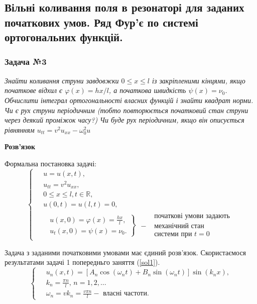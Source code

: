 \subsection{Вільні коливання поля в резонаторі для заданих початкових умов. Ряд Фур'є по системі ортогональних функцій.}

\subsubsection{Задача №3}

\textit{Знайти коливання струни завдовжки $0 \leq x \leq l$ із закріпленими кінцями, якщо початкове відхил є $\varphi(x) = hx/l$, а початкова швидкість $\psi(x) = \nu_0$. Обчислити інтеграл ортогональності власних функцій і знайти квадрат норми. Чи є рух струни періодичним (тобто повторюється початковий стан струни через деякий проміжок часу?) Чи буде рух періодичним, якщо він описується рівнянням $u_{tt} = v^2 u_{xx} - \omega_0^2 u$}

\begin{center}
    \textbf{Розв'язок}
\end{center}
Формальна постановка задачі:
\begin{equation} \label{probcond3}
    \left\{ \begin{aligned} %
        &\;u = u(x,t), \\
        &\;u_{tt} = v^2 u_{xx}, \\
        &\;0 \leq x \leq l, t \in \mathbb{R}, \\
        &\;u(0,t) = u(l,t) = 0,\\
        &\left.\begin{aligned}
            &u(x,0) = \varphi(x) = \frac{hx}{l}, \\ 
            &u_t(x,0) = \psi(x) = \nu_0.
        \end{aligned}\right\} \; 
        \begin{aligned}
            &\text{ початкові умови задають} \\
          - &\text{ механічний стан} \\
            &\text{ системи при } t = 0
        \end{aligned}
    \end{aligned} \right.
\end{equation}

Задача з заданими початковими умовами має єдиний розв'язок. Скористаємося результатами задачі 1 попередньго заняття (\ref{sol1}).
\begin{equation*}
    \left\{ \begin{aligned} \label{fullsol}
        \;&u_n(x,t) = \left[A_n\cos(\omega_n t) + B_n\sin(\omega_n t)\right] \sin(k_n x), \\
        &k_n = \frac{\pi n}{l}, \, n = 1, 2,\ldots\\
        &\omega_n = vk_n = \frac{v \pi n}{l} - \text{ власні частоти}.
    \end{aligned}\right.
\end{equation*}

